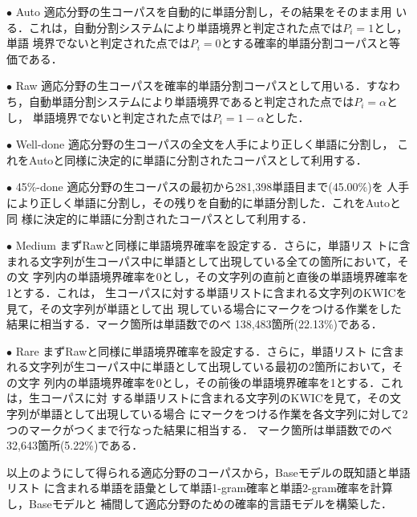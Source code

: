 \begin{list}{}{}

\item[$\bullet$ Auto] 適応分野の生コーパスを自動的に単語分割し，その結果をそのまま用
  いる．これは，自動分割システムにより単語境界と判定された点では$P_{i} = 1$とし，単語
  境界でないと判定された点では$P_{i} = 0$とする確率的単語分割コーパスと等価である．

\item[$\bullet$ Raw] 適応分野の生コーパスを確率的単語分割コーパスとして用いる．すなわ
  ち，自動単語分割システムにより単語境界であると判定された点では$P_{i} = \alpha$とし，
  単語境界でないと判定された点では$P_{i} = 1- \alpha$とした．

\item[$\bullet$ Well-done] 適応分野の生コーパスの全文を人手により正しく単語に分割し，
  これをAutoと同様に決定的に単語に分割されたコーパスとして利用する．

\item[$\bullet$ 45\%-done] 適応分野の生コーパスの最初から281,398単語目まで(45.00\%)を
  人手により正しく単語に分割し，その残りを自動的に単語分割した．これをAutoと同
  様に決定的に単語に分割されたコーパスとして利用する．

\item[$\bullet$ Medium] まずRawと同様に単語境界確率を設定する．さらに，単語リス
  トに含まれる文字列が生コーパス中に単語として出現している全ての箇所において，その文
  字列内の単語境界確率を0とし，その文字列の直前と直後の単語境界確率を1とする．これは，
  生コーパスに対する単語リストに含まれる文字列のKWICを見て，その文字列が単語として出
  現している場合にマークをつける作業をした結果に相当する．マーク箇所は単語数でのべ
  138,483箇所(22.13\%)である．

\item[$\bullet$ Rare] まずRawと同様に単語境界確率を設定する．さらに，単語リスト
  に含まれる文字列が生コーパス中に単語として出現している最初の2箇所において，その文字
  列内の単語境界確率を0とし，その前後の単語境界確率を1とする．これは，生コーパスに対
  する単語リストに含まれる文字列のKWICを見て，その文字列が単語として出現している場合
  にマークをつける作業を各文字列に対して2つのマークがつくまで行なった結果に相当する．
  マーク箇所は単語数でのべ32,643箇所(5.22\%)である．

\end{list}

以上のようにして得られる適応分野のコーパスから，Baseモデルの既知語と単語リスト
に含まれる単語を語彙として単語1-gram確率と単語2-gram確率を計算し，Baseモデルと
補間して適応分野のための確率的言語モデルを構築した．



